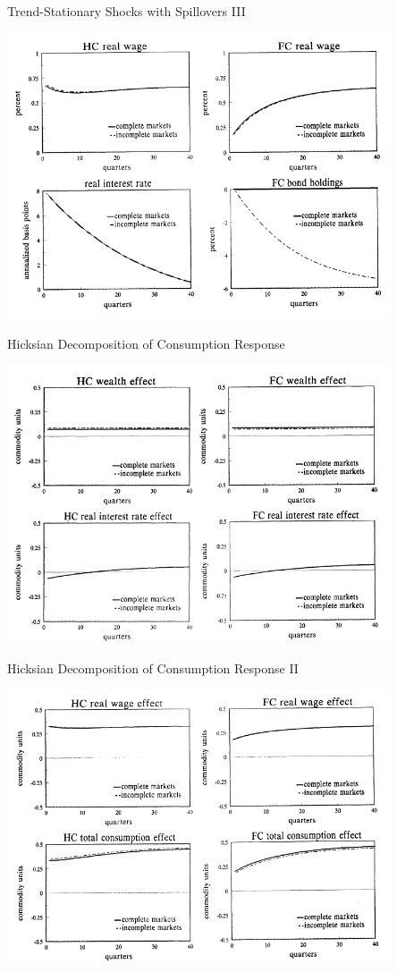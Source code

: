 \documentclass[10pt]{beamer}
\begin{document}
\begin{frame}{Trend-Stationary Shocks with Spillovers III}
\centerline{\includegraphics[width=0.85\textwidth]{u3.png}}
\end{frame}

\begin{frame}{Hicksian Decomposition of Consumption Response}
\centerline{\includegraphics[width=0.85\textwidth]{u6.png}}
\end{frame}

\begin{frame}{Hicksian Decomposition of Consumption Response II}
\centerline{\includegraphics[width=0.85\textwidth]{u7.png}}
\end{frame}
\end{document}
